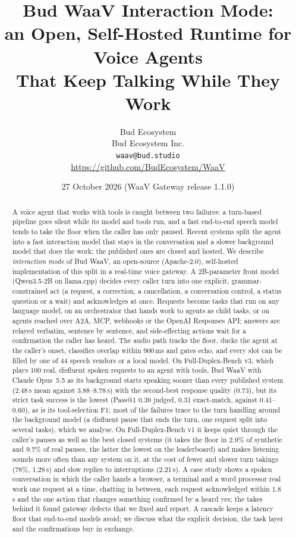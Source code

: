 \documentclass[11pt,a4paper]{article}
\title{\textbf{Bud WaaV Interaction Mode:\\an Open, Self-Hosted Runtime for Voice Agents\\That Keep Talking While They Work}}
\author{Bud Ecosystem\\[0.3em]
  \normalsize Bud Ecosystem Inc.\\
  \normalsize \texttt{waav@bud.studio}\\
  \normalsize \url{https://github.com/BudEcosystem/WaaV}}
\date{27 October 2026 \quad (WaaV Gateway release 1.1.0)}
\begin{document}
\maketitle

\begin{abstract}
\noindent
A voice agent that works with tools is caught between two failures: a turn-based pipeline goes silent while
its model and tools run, and a fast end-to-end speech model tends to take the floor when the caller has only
paused. Recent systems split the agent into a fast interaction model that stays in the conversation and a
slower background model that does the work; the published ones are closed and hosted. We describe
\emph{interaction mode} of Bud WaaV, an open-source (Apache-2.0), self-hosted implementation of this split in a
real-time voice gateway. A 2B-parameter front model (Qwen3.5-2B on llama.cpp) decides every caller turn into
one explicit, grammar-constrained act (a request, a correction, a cancellation, a conversation control, a status
question or a wait) and acknowledges at once. Requests become tasks that run on any language model, on an
orchestrator that hands work to agents as child tasks, or on agents reached over A2A, MCP, webhooks or the
OpenAI Responses API; answers are relayed verbatim, sentence by sentence, and side-effecting actions wait for a
confirmation the caller has heard. The audio path tracks the floor, ducks the agent at the caller's onset,
classifies overlap within 900\,ms and gates echo, and every slot can be filled by one of 44 speech vendors or a
local model. On Full-Duplex-Bench v3, which plays 100 real, disfluent spoken requests to an agent with tools,
Bud WaaV with Claude Opus~5.5 as its background starts speaking sooner than every published system (2.48\,s
mean against 3.88--8.78\,s) with the second-best response quality (0.73), but its strict task success is the
lowest (Pass@1 0.39 judged, 0.31 exact-match, against 0.41--0.60), as is its tool-selection F1; most of the
failures trace to the turn handling around the background model (a disfluent pause that ends the turn, one
request split into several tasks), which we analyse. On
Full-Duplex-Bench v1 it keeps quiet through the caller's pauses as well as the best closed systems (it takes
the floor in 2.9\% of synthetic and 9.7\% of real pauses, the latter the lowest on the leaderboard) and makes
listening sounds more often than any system on it, at the cost of fewer and slower turn takings (78\%, 1.28\,s) and slow replies to interruptions (2.21\,s). A case study shows a spoken conversation in which the caller hands a browser, a terminal and a word
processor real work one request at a time, chatting in between, each request acknowledged within 1.8\,s and
the one action that changes something confirmed by a heard yes; the takes behind it found gateway defects that
we fixed and report.
A cascade keeps a latency floor that end-to-end models avoid; we discuss what the
explicit decision, the task layer and the confirmations buy in exchange.
\end{abstract}
\end{document}
